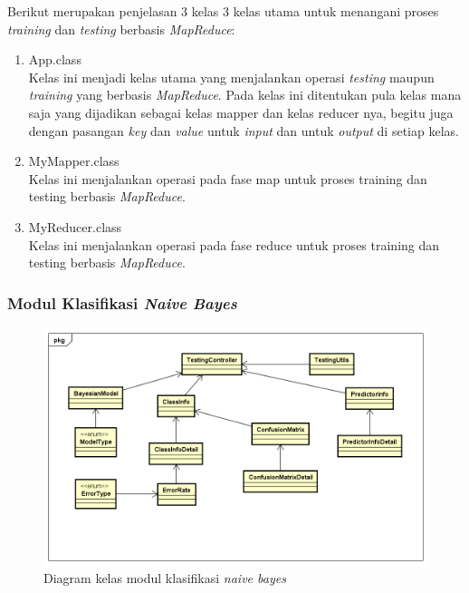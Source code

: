 Berikut merupakan penjelasan 3 kelas 3 kelas utama untuk menangani proses \textit{training} dan \textit{testing} berbasis \textit{MapReduce}:

\begin{enumerate}
\item{App.class} \\
Kelas ini menjadi kelas utama yang menjalankan operasi \textit{testing} maupun \textit{training} yang berbasis \textit{MapReduce}. Pada kelas ini ditentukan pula kelas mana saja yang dijadikan sebagai kelas mapper dan kelas reducer nya, begitu juga dengan pasangan \textit{key} dan \textit{value} untuk \textit{input} dan untuk \textit{output} di setiap kelas.
\item{MyMapper.class} \\
Kelas ini menjalankan operasi pada fase map untuk proses training dan testing berbasis \textit{MapReduce}.
\item{MyReducer.class} \\
Kelas ini menjalankan operasi pada fase reduce untuk proses training dan testing berbasis \textit{MapReduce}.
\end{enumerate}

\subsubsection{Modul Klasifikasi \textit{Naive Bayes}}
\begin{figure}[H]
	\centering
	\includegraphics[scale=0.65]{ClassDiagram/Simple_CD_Klasifikasi}
	\caption[Diagram kelas modul klasifikasi \textit{naive bayes}]{Diagram kelas modul klasifikasi \textit{naive bayes}}
	\label{fig:Diagram kelas modul klasifikasi naive bayes}
\end{figure}

